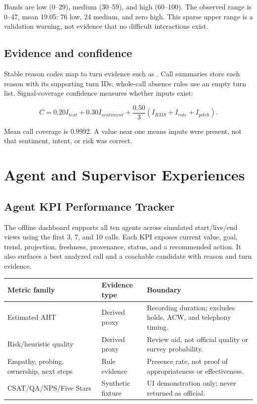 \documentclass[11pt,letterpaper]{article}
\begin{document}
Bands are low (0--29), medium (30--59), and high (60--100). The observed range is
0--47, mean 19.05: 76 low, 24 medium, and zero high. This sparse upper range is a
validation warning, not evidence that no difficult interactions exist.

\subsection{Evidence and confidence}

Stable reason codes map to turn evidence such as . Call summaries
store each reason with its supporting turn IDs; whole-call absence rules use an empty
turn list. Signal-coverage confidence measures whether inputs exist:

\[
C = 0.20 I_{text} + 0.30 I_{sentiment} +
\frac{0.50}{3}(I_{RMS}+I_{rate}+I_{pitch}).
\]

Mean call coverage is 0.9992. A value near one means inputs were present, not that
sentiment, intent, or risk was correct.

\clearpage
\section{Agent and Supervisor Experiences}

\subsection{Agent KPI Performance Tracker}

The offline dashboard supports all ten agents across simulated start/live/end views
using the first 3, 7, and 10 calls. Each KPI exposes current value, goal, trend,
projection, freshness, provenance, status, and a recommended action. It also surfaces a
best analyzed call and a coachable candidate with reason and turn evidence.

\begin{center}\small
\begin{tabular}{p{}p{}p{}}
\toprule
Metric family & Evidence type & Boundary \\
\midrule
Estimated AHT & Derived proxy & Recording duration; excludes holds, ACW, and telephony timing. \\
Risk/heuristic quality & Derived proxy & Review aid, not official quality or survey probability. \\
Empathy, probing, ownership, next steps & Rule evidence & Presence rate, not proof of appropriateness or effectiveness. \\
CSAT/QA/NPS/Five Stars & Synthetic fixture & UI demonstration only; never returned as official. \\
\bottomrule
\end{tabular}
\end{center}
\end{document}
